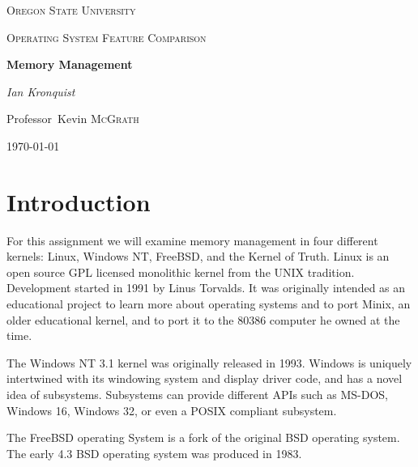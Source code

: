\documentclass[10pt,conference,draftclsnofoot,onecolumn]{IEEEtran}
\begin{document}
\begin{titlepage}
    \centering
    {\scshape\LARGE Oregon State University \par}
    \vspace{1cm}
    {\scshape\Large Operating System Feature Comparison \par}
    \vspace{1.5cm}
    {\huge\bfseries Memory Management \par}
    \vspace{2cm}
    {\Large\itshape Ian Kronquist \par}
    \vfill
    \par
    Professor~Kevin \textsc{McGrath}

    \vfill

    {\large \today\par}
\end{titlepage}


\author{
}

\bigskip

\section{Introduction}
For this assignment we will examine memory management in four different kernels: Linux, Windows NT, FreeBSD, and the Kernel of Truth.
Linux is an open source GPL licensed monolithic kernel from the UNIX tradition. Development started in 1991 by Linus Torvalds. It was originally intended as an educational project to learn more about operating systems and to port Minix, an older educational kernel, and to port it to the 80386 computer he owned at the time\cite{1_love_2010}.

The Windows NT 3.1 kernel was originally released in 1993. Windows is uniquely intertwined with its windowing system and display driver code, and has a novel idea of subsystems. Subsystems can provide different APIs such as MS-DOS, Windows 16, Windows 32, or even a POSIX compliant subsystem\cite{2_russinovich_solomon_ionescu_2012}.

The FreeBSD operating System is a fork of the original BSD operating system. The early 4.3 BSD operating system was produced in 1983\cite{3_mckusick_neville-neil_watson_2015}.
\end{document}
